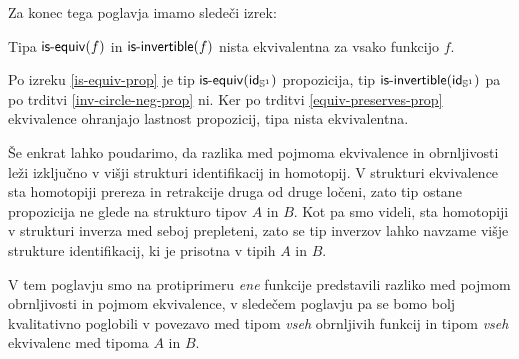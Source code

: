 Za konec tega poglavja imamo sledeči izrek:

\begin{izrek}
  Tipa \(\textnormal{\textsf{is-equiv}}(f)\) in \(\textnormal{\textsf{is-invertible}}(f)\) nista ekvivalentna za vsako funkcijo \(f\).
\end{izrek}

\begin{dokaz}
  Po izreku \ref{is-equiv-prop} je tip \(\textnormal{\textsf{is-equiv}}(\textnormal{\textsf{id}}_{\mathbb{S}^{1}})\) propozicija, tip \(\textnormal{\textsf{is-invertible}}(\textnormal{\textsf{id}}_{\mathbb{S}^{1}})\) pa po trditvi \ref{inv-circle-neg-prop} ni. Ker po trditvi \ref{equiv-preserves-prop} ekvivalence ohranjajo lastnost propozicij, tipa nista ekvivalentna.
\end{dokaz}

Še enkrat lahko poudarimo, da razlika med pojmoma ekvivalence in obrnljivosti leži izključno v višji strukturi identifikacij in homotopij. V strukturi ekvivalence sta homotopiji prereza in retrakcije druga od druge ločeni, zato tip ostane propozicija ne glede na strukturo tipov \(A\) in \(B\). Kot pa smo videli, sta homotopiji v strukturi inverza med seboj prepleteni, zato se tip inverzov lahko navzame višje strukture identifikacij, ki je prisotna v tipih \(A\) in \(B\).

V tem poglavju smo na protiprimeru \emph{ene} funkcije predstavili razliko med pojmom obrnljivosti in pojmom ekvivalence, v sledečem poglavju pa se bomo bolj kvalitativno poglobili v povezavo med tipom \emph{vseh} obrnljivih funkcij in tipom \emph{vseh} ekvivalenc med tipoma \(A\) in \(B\).

